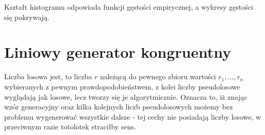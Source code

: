 \documentclass[12pt]{mwart}
\begin{document}
 	\begin{figure} [H]
 	\centering 
 	\end{figure}
 
 	
 	
 	 	\noindent Kształt histogramu odpowiada funkcji gęstości empirycznej, a wykresy gęstości  się pokrywają.
 	
 
 	
 	\section{Liniowy generator kongruentny}
 	\noindent
 	Liczba losowa jest, to liczba $r$  należącą do pewnego zbioru wartości ${r_1, ..., r_n}$ wybieranych z pewnym prawdopodobieństwem, z kolei liczby pseudolosowe wyglądają jak losowe, lecz tworzy się je algorytmicznie. Oznacza to, iż znając wzór generacyjny oraz kilka kolejnych liczb pseudolosowych możemy bez problemu wygenerować wszystkie dalsze - tej cechy nie posiadają liczby losowe, w przeciwnym razie totolotek straciłby sens.
 	
\end{document}
